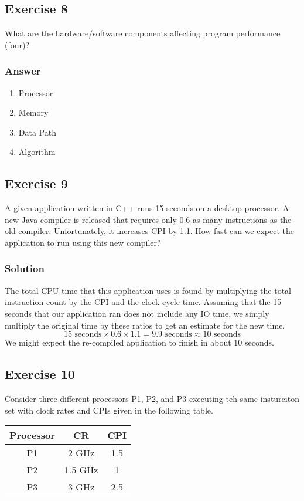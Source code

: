 \documentclass[12pt]{article}
\begin{document}
\subsection*{Exercise 8}
What are the hardware/software components affecting program performance (four)?
\subsubsection*{Answer}
\begin{enumerate}
\item Processor
\item Memory
\item Data Path
\item Algorithm
\end{enumerate}

\subsection*{Exercise 9}
A given application written in C++ runs 15 seconds on a desktop processor. A new Java compiler is released that requires only 0.6 as many instructions as the old compiler. Unfortunately, it increases CPI by 1.1. How fast can we expect the application to run using this new compiler?
\subsubsection*{Solution}
The total CPU time that this application uses is found by multiplying the total instruction count by the CPI and the clock cycle time. Assuming that the 15 seconds that our application ran does not include any IO time, we simply multiply the original time by these ratios to get an estimate for the new time.
\[
15\text{ seconds} \times 0.6 \times 1.1 = 9.9 \text{ seconds} \approx \boxed{10 \text{ seconds}}
\]
We might expect the re-compiled application to finish in about 10 seconds.

\subsection*{Exercise 10}
Consider three different processors P1, P2, and P3 executing teh same insturciton set with clock rates and CPIs given in the following table.

\begin{center}
\begin{tabular}{| c | c | c |}
\hline
Processor & CR & CPI \\
\hline
P1 & 2 GHz & 1.5 \\
\hline
P2 & 1.5 GHz & 1 \\
\hline
P3 & 3 GHz & 2.5 \\
\hline
\end{tabular}
\end{center}
\end{document}
